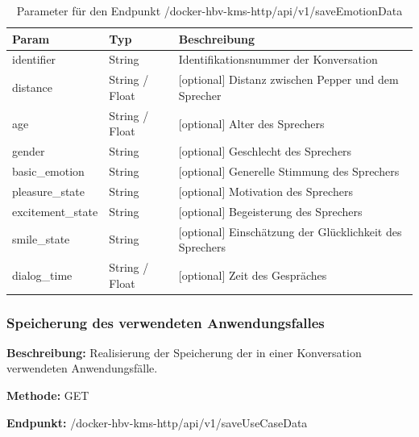 \begin{table}[H]
    \label{table:/docker-hbv-kms-http/api/v1/saveEmotionData}
    \caption{Parameter für den Endpunkt /docker-hbv-kms-http/api/v1/saveEmotionData}
    \setlength{\tabcolsep}{3pt}
    \begin{tabular}{p{100pt}p{80pt}p{200pt}}
        \toprule
        Param             & Typ            & Beschreibung                                            \\
        \midrule
        identifier        & String         & Identifikationsnummer der Konversation                  \\
        distance          & String / Float & [optional] Distanz zwischen Pepper und dem Sprecher     \\
        age               & String / Float & [optional] Alter des Sprechers                          \\
        gender            & String         & [optional] Geschlecht des Sprechers                     \\
        basic\_emotion    & String         & [optional] Generelle Stimmung des Sprechers             \\
        pleasure\_state   & String         & [optional] Motivation des Sprechers                     \\
        excitement\_state & String         & [optional] Begeisterung des Sprechers                   \\
        smile\_state      & String         & [optional] Einschätzung der Glücklichkeit des Sprechers \\
        dialog\_time      & String / Float & [optional] Zeit des Gespräches                          \\
        \bottomrule
    \end{tabular}
\end{table}

\dotfill

\subsubsection{Speicherung des verwendeten Anwendungsfalles}
\label{sec:api-saveUseCaseData}
\textbf{Beschreibung:} Realisierung der Speicherung der in einer Konversation verwendeten Anwendungsfälle.

\textbf{Methode:} GET

\textbf{Endpunkt:} /docker-hbv-kms-http/api/v1/saveUseCaseData

